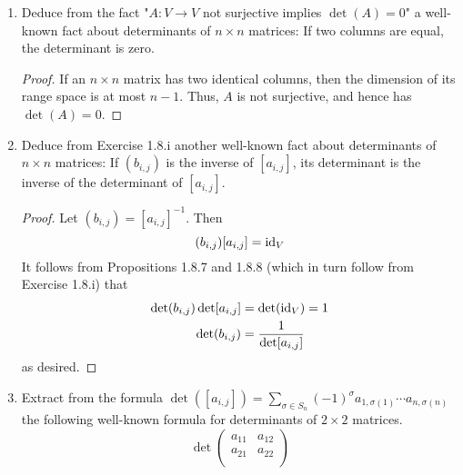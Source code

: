 \documentclass[../psets.tex]{subfiles}
\begin{document}
\begin{enumerate}[label={\textbf{1.8.\roman*.}}]
\begin{enumerate}
\begin{proof}
            \begin{align*}
                B^*A^*\omega &= B^*(\pi(A^*T))\\
                &= \pi(B^*A^*T)\\
                &= \pi((AB)^*T)\\
                &= (AB^*)\omega
            \end{align*}
            as desired.
        \end{proof}
    \end{enumerate}
    \item Deduce from the fact "$A:V\to V$ not surjective implies $\det(A)=0$" a well-known fact about determinants of $n\times n$ matrices: If two columns are equal, the determinant is zero.
    \begin{proof}
        If an $n\times n$ matrix has two identical columns, then the dimension of its range space is at most $n-1$. Thus, $A$ is not surjective, and hence has $\det(A)=0$.
    \end{proof}
    \item Deduce from Exercise 1.8.i another well-known fact about determinants of $n\times n$ matrices: If $(b_{i,j})$ is the inverse of $[a_{i,j}]$, its determinant is the inverse of the determinant of $[a_{i,j}]$.
    \begin{proof}
        Let $(b_{i,j})=[a_{i,j}]^{-1}$. Then
        \begin{equation*}
            (b_{i,j})[a_{i,j}] = \operatorname{id}_V
        \end{equation*}
        It follows from Propositions 1.8.7 and 1.8.8 (which in turn follow from Exercise 1.8.i) that
        \begin{align*}
            \det(b_{i,j})\det[a_{i,j}] &= \det(\operatorname{id}_V) = 1\\
            \det(b_{i,j}) &= \frac{1}{\det[a_{i,j}]}
        \end{align*}
        as desired.
    \end{proof}
    \item Extract from the formula $\det([a_{i,j}])=\sum_{\sigma\in S_n}(-1)^\sigma a_{1,\sigma(1)}\cdots a_{n,\sigma(n)}$ the following well-known formula for determinants of $2\times 2$ matrices.
    \begin{equation*}
        \det
        \begin{pmatrix}
            a_{11} & a_{12}\\
            a_{21} & a_{22}\\
        \end{pmatrix}

\end{equation*}
\end{enumerate}
\end{document}
